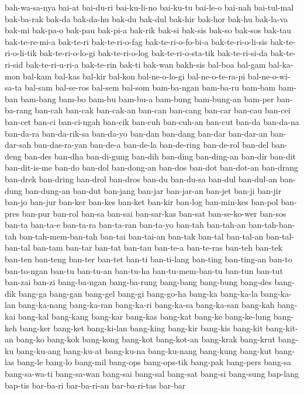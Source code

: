 {bah-wa-sa-nya bai-at bai-du-ri bai-ku-li-no bai-ku-tu bai-le-o bai-nah
bai-tul-mal bak-ba-rak bak-da bak-da-hu bak-du bak-dul bak-hir bak-hor
bak-hu bak-la-va bak-mi bak-pa-o bak-pau bak-pi-a bak-rik bak-si bak-sis
bak-so bak-sos bak-tau bak-te-re-mi-a bak-te-ri bak-te-ri-o-fag
bak-te-ri-o-fo-bi-a bak-te-ri-o-li-sis bak-te-ri-o-li-tik
bak-te-ri-o-lo-gi bak-te-ri-o-log bak-te-ri-o-sta-tik bak-te-ri-si-da
bak-te-ri-sid bak-te-ri-u-ri-a bak-te-rin bak-ti bak-wan bakh-sis bal-boa
bal-gam bal-ka-mon bal-kam bal-kas bal-kir bal-kon bal-ne-o-lo-gi
bal-ne-o-te-ra-pi bal-ne-o-wi-sa-ta bal-sam bal-se-ros bal-sem bal-som
bam-ba-ngan bam-ba-ru bam-bam bam-ban bam-bang bam-bo bam-bu bam-bu-a
bam-bung bam-bung-an bam-per ban-ba-rang ban-cah ban-cak ban-cak-an
ban-can ban-cang ban-car ban-cau ban-cei ban-cet ban-ci ban-ci-ngah
ban-cik ban-cuh ban-cuh-an ban-cut ban-da ban-da-na ban-da-ra
ban-da-rik-sa ban-da-yo ban-dan ban-dang ban-dar ban-dar-an ban-dar-sah
ban-das-ra-yan ban-de-a ban-de-la ban-de-ring ban-de-rol ban-del ban-deng
ban-des ban-dha ban-di-gung ban-dih ban-ding ban-ding-an ban-dir ban-dit
ban-dit-is-me ban-do ban-dol ban-dong-an ban-dos ban-dot ban-dot-an
ban-drang ban-drek ban-dring ban-drol ban-dros ban-du ban-du-sa ban-dul
ban-dul-an ban-dung ban-dung-an ban-dut ban-jang ban-jar ban-jar-an
ban-jet ban-ji ban-jir ban-jo ban-jur ban-ker ban-kes ban-ket ban-kir
ban-log ban-min-kes ban-pol ban-pres ban-pur ban-rol ban-sa ban-sai
ban-sar-kas ban-sat ban-se-ko-wer ban-sos ban-ta ban-ta-e ban-ta-ra
ban-ta-ran ban-ta-yo ban-tah ban-tah-an ban-tah-ban-tah
ban-tah-mem-ban-tah ban-tai ban-tai-an ban-tak ban-tal ban-tal-an
ban-tal-ban-tal ban-tam ban-tar ban-tat ban-tau ban-te-a ban-te-ras
ban-teh ban-tek ban-ten ban-teng ban-ter ban-tet ban-ti ban-ti-lang
ban-ting ban-ting-an ban-to ban-to-ngan ban-tu ban-tu-an ban-tu-ha
ban-tu-mem-ban-tu ban-tun ban-tut ban-zai ban-zi bang-ba-ngan bang-ba-rung
bang-bang bang-bung bang-des bang-dik bang-ga bang-gan bang-gel bang-gi
bang-go-ha bang-ka bang-ka-la bang-ka-lan bang-ka-nang bang-ka-ran
bang-ka-ri bang-ka-sa bang-ka-san bang-kah bang-kai bang-kal bang-kang
bang-kar bang-kas bang-kat bang-ke bang-ke-lung bang-keh bang-ker bang-ket
bang-ki-lan bang-king bang-kir bang-kis bang-kit bang-kit-an bang-ko
bang-kok bang-kong bang-kot bang-kot-an bang-krak bang-krut bang-ku
bang-ku-ang bang-ku-at bang-ku-na bang-ku-nang bang-kung bang-kut bang-las
bang-le bang-lo bang-mil bang-ops bang-ops-tik bang-pak bang-pers bang-sa
bang-sa-wa-ti bang-sa-wan bang-sai bang-sal bang-sat bang-si bang-sung
bap-lang bap-tis bar-ba-ri bar-ba-ri-an bar-ba-ri-tas bar-bar
}

